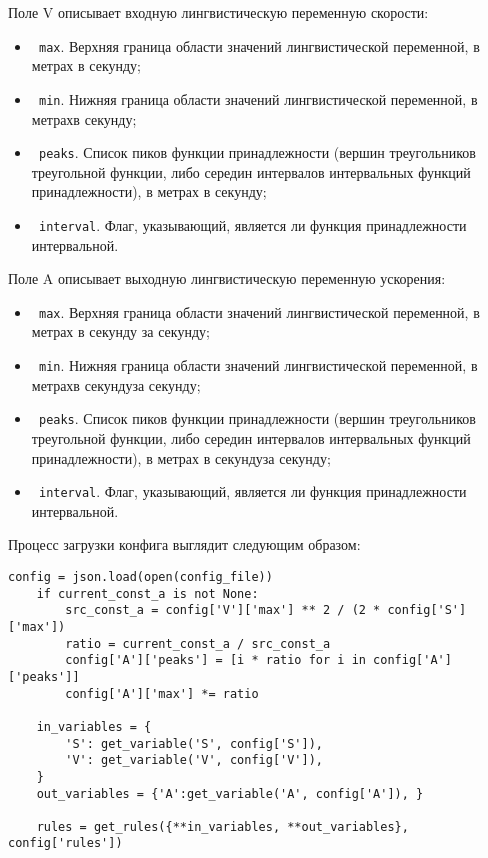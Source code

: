 Поле V описывает входную лингвистическую переменную скорости:
\begin{itemize}
	\item \lstinline! max!. Верхняя граница области значений лингвистической переменной, в метрах в секунду;
	\item \lstinline! min!. Нижняя граница области значений лингвистической переменной, в метрахв секунду;
	\item \lstinline! peaks!. Список пиков функции принадлежности (вершин треугольников треугольной функции, либо середин интервалов интервальных функций принадлежности), в метрах в секунду;
	\item \lstinline! interval!. Флаг, указывающий, является ли функция принадлежности интервальной.
\end{itemize}

Поле A описывает выходную лингвистическую переменную ускорения:
\begin{itemize}
	\item \lstinline! max!. Верхняя граница области значений лингвистической переменной, в метрах в секунду за секунду;
	\item \lstinline! min!. Нижняя граница области значений лингвистической переменной, в метрахв секундуза секунду;
	\item \lstinline! peaks!. Список пиков функции принадлежности (вершин треугольников треугольной функции, либо середин интервалов интервальных функций принадлежности), в метрах в секундуза секунду;
	\item \lstinline! interval!. Флаг, указывающий, является ли функция принадлежности интервальной.
\end{itemize}

Процесс загрузки конфига выглядит следующим образом:
\begin{lstlisting}[style=pythonstyle,caption={  }, label=lst:func:1]
config = json.load(open(config_file))
	if current_const_a is not None:
		src_const_a = config['V']['max'] ** 2 / (2 * config['S']['max'])
		ratio = current_const_a / src_const_a
		config['A']['peaks'] = [i * ratio for i in config['A']['peaks']]
		config['A']['max'] *= ratio

	in_variables = {
		'S': get_variable('S', config['S']),
		'V': get_variable('V', config['V']),
	}
	out_variables = {'A':get_variable('A', config['A']), }

	rules = get_rules({**in_variables, **out_variables}, config['rules'])
\end{lstlisting}



